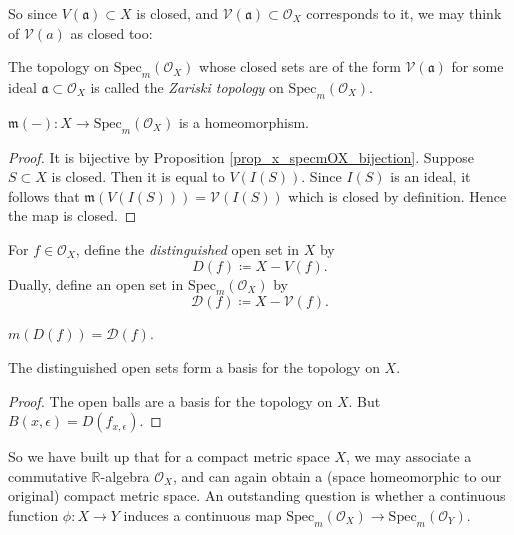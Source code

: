 \documentclass[12pt]{article}
\begin{document}
So since $V(\mathfrak{a})\subset X$ is closed, and $\mathcal{V}(\mathfrak{a})\subset\mathcal{O}_X$ corresponds to it, we may think of $\mathcal{V}(a)$ as closed too:

\begin{definition}
	The topology on $\text{Spec}_m(\mathcal{O}_X)$ whose closed sets are of the form $\mathcal{V}(\mathfrak{a})$ for some ideal $\mathfrak{a}\subset\mathcal{O}_X$ is called the \emph{Zariski topology} on $\text{Spec}_m(\mathcal{O}_X)$. 
\end{definition}

\begin{corollary}
	$\mathfrak{m}(-):X\to\text{Spec}_m(\mathcal{O}_X)$ is a homeomorphism.
\end{corollary}
\begin{proof}
	It is bijective by Proposition \ref{prop_x_specmOX_bijection}. Suppose $S\subset X$ is closed. Then it is equal to $V(I(S))$. Since $I(S)$ is an ideal, it follows that $\mathfrak{m}(V(I(S)))=\mathcal{V}(I(S))$ which is closed by definition. Hence the map is closed.
\end{proof}

\begin{definition}
	For $f\in \mathcal{O}_X$, define the \emph{distinguished} open set in $X$ by 
	\begin{equation*}
		D(f) \coloneqq X - V(f).
	\end{equation*}
	Dually, define an open set in $\text{Spec}_m(\mathcal{O}_X)$ by 
	\begin{equation*}
		\mathcal{D}(f) \coloneqq X - \mathcal{V}(f).
	\end{equation*}
\end{definition}

\begin{corollary}
	$m(D(f)) = \mathcal{D}(f)$.
\end{corollary}

\begin{proposition}
	The distinguished open sets form a basis for the topology on $X$.
\end{proposition}
\begin{proof}
	The open balls are a basis for the topology on $X$. But $B(x,\epsilon) = D(f_{x,\epsilon})$. 
\end{proof}

So we have built up that for a compact metric space $X$, we may associate a commutative $\mathbb{R}$-algebra $\mathcal{O}_X$, and can again obtain a (space homeomorphic to our original) compact metric space. An outstanding question is whether a continuous function $\phi:X\to Y$ induces a continuous map $\text{Spec}_m(\mathcal{O}_X)\to\text{Spec}_m(\mathcal{O}_Y)$.
\end{document}
